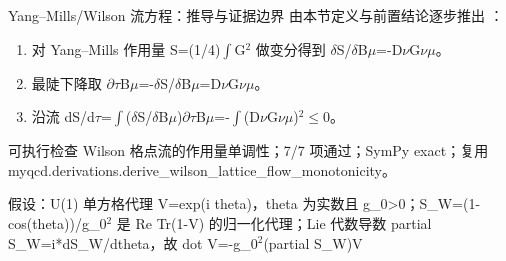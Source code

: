 \begin{frame}[t]{Yang--Mills/\allowbreak{}Wilson 流方程：推导与证据边界}
\footnotesize
{}\quad 由本节定义与前置结论逐步推出 ：
\begin{enumerate}
\item 对 Yang--Mills 作用量 S=(1/\allowbreak{}4)\ensuremath{\int}G\ensuremath{^{2}} 做变分得到 \ensuremath{\delta}S/\allowbreak{}\ensuremath{\delta}B\ensuremath{\mu}=-D\ensuremath{\nu}G\ensuremath{\nu}\ensuremath{\mu}。
\item 最陡下降取 \ensuremath{\partial}\ensuremath{\tau}B\ensuremath{\mu}=-\ensuremath{\delta}S/\allowbreak{}\ensuremath{\delta}B\ensuremath{\mu}=D\ensuremath{\nu}G\ensuremath{\nu}\ensuremath{\mu}。
\item 沿流 dS/\allowbreak{}d\ensuremath{\tau}=\ensuremath{\int}(\ensuremath{\delta}S/\allowbreak{}\ensuremath{\delta}B\ensuremath{\mu})\ensuremath{\partial}\ensuremath{\tau}B\ensuremath{\mu}=-\ensuremath{\int}(D\ensuremath{\nu}G\ensuremath{\nu}\ensuremath{\mu})\ensuremath{^{2}}\ensuremath{\le}0。
\end{enumerate}\begin{block}{可执行检查}
\quad Wilson 格点流的作用量单调性；7/7 项通过；SymPy exact；复用 myqcd.derivations.derive\_wilson\_lattice\_flow\_monotonicity。
\par\scriptsize 假设：U(1) 单方格代理 V=exp(i theta)，theta 为实数且 g\_0>0；S\_W=(1-cos(theta))/\allowbreak{}g\_0\ensuremath{^{2}} 是 Re Tr(1-V) 的归一化代理；Lie 代数导数 partial S\_W=i*dS\_W/\allowbreak{}dtheta，故 dot V=-g\_0\ensuremath{^{2}}(partial S\_W)V
\end{block}
\end{frame}

